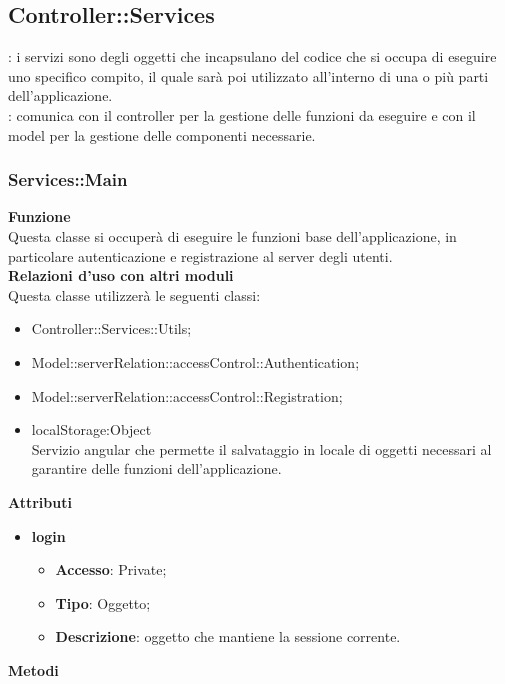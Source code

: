 {	\subsection {Controller::\-Services}{
		\label{sec:services}
		\textbf{\tipo}: i servizi sono degli oggetti che incapsulano del codice che si occupa di eseguire uno specifico compito, il quale sarà poi utilizzato all’interno di una o più parti dell’applicazione.\\
		\textbf{\relaz}: comunica con il controller per la gestione delle funzioni da eseguire e con il model per la gestione delle componenti necessarie.

		\subsubsection{Services::\-Main}{
			\label{sub:servicesMain}
			\textbf{Funzione}\\
			\indent Questa classe si occuperà di eseguire le funzioni base dell'applicazione, in particolare autenticazione e registrazione al server degli utenti.\\
			\textbf{Relazioni d'uso con altri moduli}\\
			\indent Questa classe utilizzerà le seguenti classi:
			\begin{itemize}
				\item Controller::Services::\-Utils;
				\item Model::serverRelation::accessControl::Authentication;
				\item Model::serverRelation::accessControl::Registration;
				\item localStorage:Object\\
					\indent Servizio angular che permette il salvataggio in locale di oggetti necessari al  garantire delle funzioni dell'applicazione.
			\end{itemize}
			\textbf{Attributi}
			\begin{itemize}
				\item \textbf{login}
				\begin{itemize}
					\item \textbf{Accesso}: Private;
					\item \textbf{Tipo}: Oggetto;
					\item \textbf{Descrizione}: oggetto che mantiene la sessione corrente.
				\end{itemize}
			\end{itemize}
			\textbf{Metodi}
			\begin{itemize}

\end{itemize}}}}
